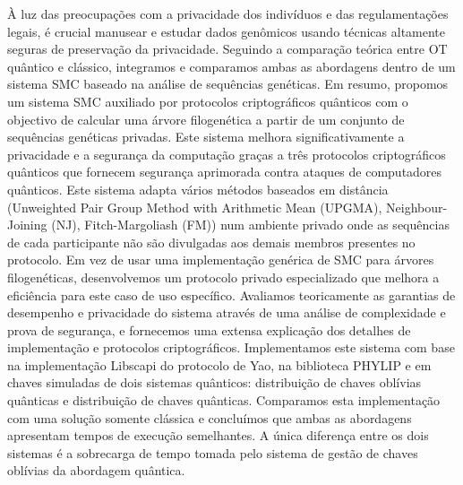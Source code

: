 \documentclass[11pt]{report}
\begin{document}
À luz das preocupações com a privacidade dos indivíduos e das regulamentações legais, é crucial manusear e estudar dados genômicos usando técnicas altamente seguras de preservação da privacidade. Seguindo a comparação teórica entre OT quântico e clássico, integramos e comparamos ambas as abordagens dentro de um sistema SMC baseado na análise de sequências genéticas. Em resumo, propomos um sistema SMC auxiliado por protocolos criptográficos quânticos com o objectivo de calcular uma árvore filogenética a partir de um conjunto de sequências genéticas privadas. Este sistema melhora significativamente a privacidade e a segurança da computação graças a três protocolos criptográficos quânticos que fornecem segurança aprimorada contra ataques de computadores quânticos. Este sistema adapta vários métodos baseados em distância (Unweighted Pair Group Method with Arithmetic Mean (UPGMA), Neighbour-Joining (NJ), Fitch-Margoliash (FM)) num ambiente privado onde as sequências de cada participante não são divulgadas aos demais membros presentes no protocolo. Em vez de usar uma implementação genérica de SMC para árvores filogenéticas, desenvolvemos um protocolo privado especializado que melhora a eficiência para este caso de uso específico. Avaliamos teoricamente as garantias de desempenho e privacidade do sistema através de uma análise de complexidade e prova de segurança, e fornecemos uma extensa explicação dos detalhes de implementação e protocolos criptográficos. Implementamos este sistema com base na implementação Libscapi do protocolo de Yao, na biblioteca PHYLIP e em chaves simuladas de dois sistemas quânticos: distribuição de chaves oblívias quânticas e distribuição de chaves quânticas. Comparamos esta implementação com uma solução somente clássica e concluímos que ambas as abordagens apresentam tempos de execução semelhantes. A única diferença entre os dois sistemas é a sobrecarga de tempo tomada pelo sistema de gestão de chaves oblívias da abordagem quântica.
\end{document}
